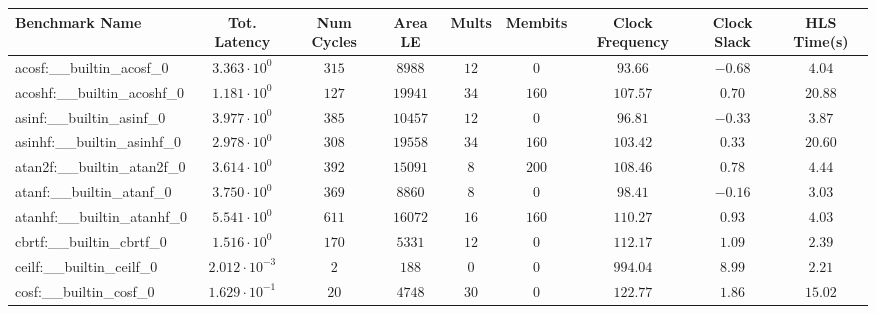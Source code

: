 \begin{tabular}{|l|c|c|c|c|c|c|c|c|}
\hline
Benchmark Name                            & Tot. Latency            & Num Cycles & Area LE    & Mults   & Membits  & Clock Frequency & Clock Slack & HLS Time(s) \\
\hline
acosf:\_\_builtin\_acosf\_0               & $ 3.363 \cdot 10^{0}  $ & $ 315    $ & $ 8988   $ & $ 12  $ & $ 0    $ & $ 93.66       $ & $ -0.68   $ & $ 4.04    $ \\
acoshf:\_\_builtin\_acoshf\_0             & $ 1.181 \cdot 10^{0}  $ & $ 127    $ & $ 19941  $ & $ 34  $ & $ 160  $ & $ 107.57      $ & $ 0.70    $ & $ 20.88   $ \\
asinf:\_\_builtin\_asinf\_0               & $ 3.977 \cdot 10^{0}  $ & $ 385    $ & $ 10457  $ & $ 12  $ & $ 0    $ & $ 96.81       $ & $ -0.33   $ & $ 3.87    $ \\
asinhf:\_\_builtin\_asinhf\_0             & $ 2.978 \cdot 10^{0}  $ & $ 308    $ & $ 19558  $ & $ 34  $ & $ 160  $ & $ 103.42      $ & $ 0.33    $ & $ 20.60   $ \\
atan2f:\_\_builtin\_atan2f\_0             & $ 3.614 \cdot 10^{0}  $ & $ 392    $ & $ 15091  $ & $ 8   $ & $ 200  $ & $ 108.46      $ & $ 0.78    $ & $ 4.44    $ \\
atanf:\_\_builtin\_atanf\_0               & $ 3.750 \cdot 10^{0}  $ & $ 369    $ & $ 8860   $ & $ 8   $ & $ 0    $ & $ 98.41       $ & $ -0.16   $ & $ 3.03    $ \\
atanhf:\_\_builtin\_atanhf\_0             & $ 5.541 \cdot 10^{0}  $ & $ 611    $ & $ 16072  $ & $ 16  $ & $ 160  $ & $ 110.27      $ & $ 0.93    $ & $ 4.03    $ \\
cbrtf:\_\_builtin\_cbrtf\_0               & $ 1.516 \cdot 10^{0}  $ & $ 170    $ & $ 5331   $ & $ 12  $ & $ 0    $ & $ 112.17      $ & $ 1.09    $ & $ 2.39    $ \\
ceilf:\_\_builtin\_ceilf\_0               & $ 2.012 \cdot 10^{-3} $ & $ 2      $ & $ 188    $ & $ 0   $ & $ 0    $ & $ 994.04      $ & $ 8.99    $ & $ 2.21    $ \\
cosf:\_\_builtin\_cosf\_0                 & $ 1.629 \cdot 10^{-1} $ & $ 20     $ & $ 4748   $ & $ 30  $ & $ 0    $ & $ 122.77      $ & $ 1.86    $ & $ 15.02   $ \\

\end{tabular}
